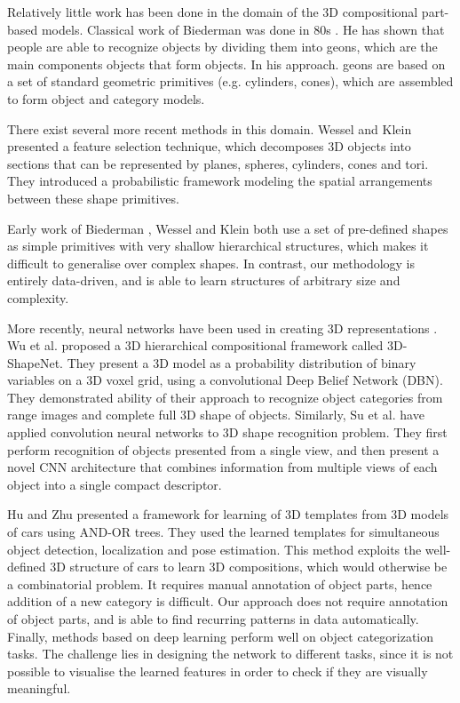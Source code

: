 \documentclass[conference]{IEEEtran}
\begin{document}
{Relatively little work has been done in the domain of the 3D
compositional part-based models. Classical work of Biederman was
done in 80s \cite{biederman1987recognition}. He has shown that
people are able to recognize objects by dividing them into geons,
which are the main components objects that form objects. In his approach.
geons are based on a set of standard geometric primitives (e.g.
cylinders, cones), which are assembled to form object and
category models.

There exist several more recent methods in this domain. Wessel and
Klein \cite{pratikakis2010learning} presented a feature selection
technique, which decomposes 3D objects into sections that can be
represented by planes, spheres, cylinders, cones and tori.
They introduced a probabilistic framework modeling the spatial
arrangements between these shape primitives.

Early work of Biederman \cite{biederman1987recognition}, Wessel and Klein \cite{pratikakis2010learning} both use a set of pre-defined shapes as simple primitives with very shallow hierarchical structures, which makes it difficult to generalise over complex shapes. In contrast, our methodology is entirely data-driven, and is able to learn structures of arbitrary size and complexity. 

More recently, neural networks have been used in creating 3D representations \cite{wu20153d,Su_2015_ICCV}. Wu et al. \cite{wu20153d} proposed a 3D hierarchical compositional
framework called 3D-ShapeNet. They present a 3D model
as a probability distribution of binary variables on a 3D voxel
grid, using a convolutional Deep Belief Network (DBN). They demonstrated
ability of their approach to recognize object categories from range
images and complete full 3D shape of objects. Similarly, Su et al. \cite{Su_2015_ICCV} have applied convolution neural
networks to 3D shape recognition problem. They first perform recognition
of objects presented from a single view, and then present a novel
CNN architecture that combines information from multiple views of each object into a single compact descriptor.

Hu and Zhu \cite{hu2015learning} presented a framework for learning
of 3D templates from 3D models of cars using AND-OR trees. They used
the learned templates for simultaneous object detection,
localization and pose estimation. This method exploits the well-defined 3D structure of cars to learn 3D compositions, which would otherwise be a combinatorial problem. It requires manual annotation of object parts, hence addition of a new category is difficult. Our approach does not require annotation of object parts, and is able to find recurring patterns in data automatically. Finally, methods based on deep learning \cite{wu20153d,Su_2015_ICCV} perform well on object categorization tasks. The challenge lies in designing the network to different tasks, since it is not possible to visualise the learned features in order to check if they are visually meaningful. 

}
\end{document}
